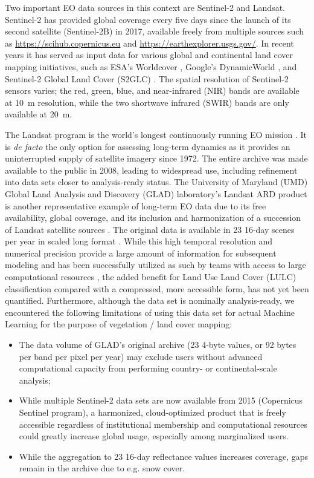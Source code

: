 Two important EO data sources in this context are Sentinel-2 and Landsat. 
Sentinel-2 has provided global coverage every five days since the launch of its second satellite (Sentinel-2B) in 2017, available freely from multiple sources such as \url{https://scihub.copernicus.eu} and \url{https://earthexplorer.usgs.gov/}. In recent years it has served as input data for various global and continental land cover mapping initiatives, such as ESA's Worldcover \citep{van2021esa}, Google's DynamicWorld \citep{brown2022dynamic}, and Sentinel-2 Global Land Cover (S2GLC) \citep{malinowski2020automated}. The spatial resolution of Sentinel-2 sensors varies; the red, green, blue, and near-infrared (NIR) bands are available at 10~m resolution, while the two shortwave infrared (SWIR) bands are only available at 20~m.

The Landsat program is the world's longest continuously running EO mission \citep{wulder2022fifty}. It is \emph{de facto} the only option for assessing long-term dynamics as it provides an uninterrupted supply of satellite imagery since 1972. The entire archive was made available to the public in 2008, leading to widespread use, including refinement into data sets closer to analysis-ready status. The University of Maryland (UMD) Global Land Analysis and Discovery (GLAD) laboratory's Landsat ARD product is another representative example of long-term EO data due to its free availability, global coverage, and its inclusion and harmonization of a succession of Landsat satellite sources \citep{potapov2020landsat}. The original data is available in 23{\texttimes} 16-day scenes per year in scaled long format \citep{potapov2020landsat}. While this high temporal resolution and numerical precision provide a large amount of information for subsequent modeling and has been successfully utilized as such by teams with access to large computational resources \citep{hansen2022global}, the added benefit for Land Use Land Cover (LULC) classification compared with a compressed, more accessible form, has not yet been quantified. Furthermore, although the data set is nominally analysis-ready, we encountered the following limitations of using this data set for actual Machine Learning for the purpose of vegetation / land cover mapping:

\begin{itemize}[noitemsep]
\item The data volume of GLAD's original archive (23 4-byte values, or 92 bytes per band per pixel per year) may exclude users without advanced computational capacity from performing country- or continental-scale analysis;
\item While multiple Sentinel-2 data sets are now available from 2015 (Copernicus Sentinel program), a harmonized, cloud-optimized product that is freely accessible regardless of institutional membership and computational resources could greatly increase global usage, especially among marginalized users.
\item While the aggregation to 23 16-day reflectance values increases coverage, gaps remain in the archive due to e.g. snow cover.
\end{itemize}

